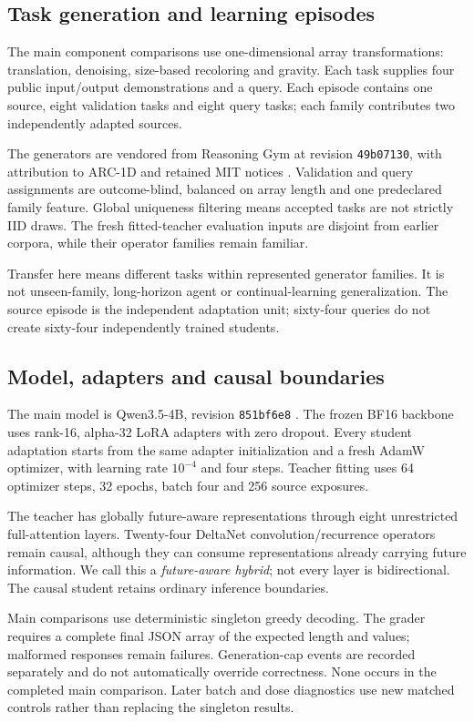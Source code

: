 \documentclass[11pt,letterpaper]{article}
\newcommand{\code}[1]{\texttt{#1}}
\begin{document}
\subsection{Task generation and learning episodes}

The main component comparisons use one-dimensional array transformations: translation, denoising, size-based recoloring and gravity. Each task supplies four public input/output demonstrations and a query. Each episode contains one source, eight validation tasks and eight query tasks; each family contributes two independently adapted sources.

The generators are vendored from Reasoning Gym at revision \code{49b07130}, with attribution to ARC-1D and retained MIT notices \citep{reasoninggymasset,arc1dasset}. Validation and query assignments are outcome-blind, balanced on array length and one predeclared family feature. Global uniqueness filtering means accepted tasks are not strictly IID draws. The fresh fitted-teacher evaluation inputs are disjoint from earlier corpora, while their operator families remain familiar.

Transfer here means different tasks within represented generator families. It is not unseen-family, long-horizon agent or continual-learning generalization. The source episode is the independent adaptation unit; sixty-four queries do not create sixty-four independently trained students.

\subsection{Model, adapters and causal boundaries}

The main model is Qwen3.5-4B, revision \code{851bf6e8} \citep{qwen35asset}. The frozen BF16 backbone uses rank-16, alpha-32 LoRA adapters with zero dropout. Every student adaptation starts from the same adapter initialization and a fresh AdamW optimizer, with learning rate $10^{-4}$ and four steps. Teacher fitting uses 64 optimizer steps, 32 epochs, batch four and 256 source exposures.

The teacher has globally future-aware representations through eight unrestricted full-attention layers. Twenty-four DeltaNet convolution/recurrence operators remain causal, although they can consume representations already carrying future information. We call this a \emph{future-aware hybrid}; not every layer is bidirectional. The causal student retains ordinary inference boundaries.

Main comparisons use deterministic singleton greedy decoding. The grader requires a complete final JSON array of the expected length and values; malformed responses remain failures. Generation-cap events are recorded separately and do not automatically override correctness. None occurs in the completed main comparison. Later batch and dose diagnostics use new matched controls rather than replacing the singleton results.
\end{document}
